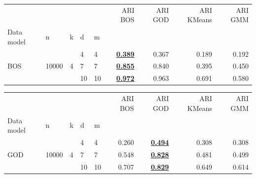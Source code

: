  \begin{table}[H]
    \begin{minipage}{.48\columnwidth}
    \begin{adjustbox}{width=\columnwidth}
    \begin{tabular}{lllllrrrr}
     &  &  &  &  & ARI BOS & ARI GOD & ARI KMeans & ARI GMM \\
    Data model & n & k & d & m &  &  &  &  \\
    \cline{1-9}
    \multirow[t]{3}{*}{BOS} & \multirow[t]{3}{*}{10000} & \multirow[t]{3}{*}{4} & 4 & 4 & \textbf{\underline{0.389}} & 0.367 & 0.189 & 0.192 \\
    \cline{4-9}
     &  &  & 7 & 7 & \textbf{\underline{0.855}} & 0.840 & 0.395 & 0.450 \\
    \cline{4-9}
     &  &  & 10 & 10 & \textbf{\underline{0.972}} & 0.963 & 0.691 & 0.580 \\
    \end{tabular}
    \end{adjustbox}
    \end{minipage} \hspace{.02\columnwidth}%
    \begin{minipage}{.48\columnwidth}
    \begin{adjustbox}{width=\columnwidth}
    \begin{tabular}{lllllrrrr}
     &  &  &  &  & ARI BOS & ARI GOD & ARI KMeans & ARI GMM \\
    Data model & n & k & d & m &  &  &  &  \\
    \cline{1-9}
    \multirow[t]{3}{*}{GOD} & \multirow[t]{3}{*}{10000} & \multirow[t]{3}{*}{4} & 4 & 4 & 0.260 & \textbf{\underline{0.494}} & 0.308 & 0.308 \\
    \cline{4-9}
     &  &  & 7 & 7 & 0.548 & \textbf{\underline{0.828}} & 0.481 & 0.499 \\
    \cline{4-9}
     &  &  & 10 & 10 & 0.707 & \textbf{\underline{0.829}} & 0.649 & 0.614 \\
    \end{tabular}
    \end{adjustbox}
    \end{minipage}


\end{table}
